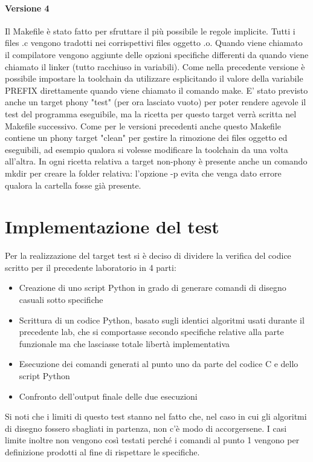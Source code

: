 \documentclass{article}
\begin{document}
		\paragraph*{Versione 4}
			Il Makefile è stato fatto per sfruttare il più possibile le regole implicite. Tutti i files .c vengono tradotti
			nei corrispettivi files oggetto .o.
			Quando viene chiamato il compilatore vengono aggiunte delle opzioni specifiche differenti da quando viene chiamato
			il linker (tutto racchiuso in variabili).
			Come nella precedente versione è possibile impostare la toolchain da utilizzare esplicitando il valore della
			variabile PREFIX direttamente quando viene chiamato il comando make.
			E' stato previsto anche un target phony "test" (per ora lasciato vuoto) per poter rendere agevole il test
			del programma eseguibile, ma la ricetta per questo target verrà scritta nel Makefile successivo.
			Come per le versioni precedenti anche questo Makefile contiene un phony target "clean" per gestire la rimozione
			dei files oggetto ed eseguibili, ad esempio qualora si volesse modificare la toolchain da una volta
			all'altra.
			In ogni ricetta relativa a target non-phony è presente anche un comando mkdir per creare la folder relativa:
			l'opzione -p evita che venga dato errore qualora la cartella fosse già presente.
\section{Implementazione del test}
	Per la realizzazione del target test si è deciso di dividere la verifica del codice scritto per il precedente laboratorio 
	in 4 parti:
	\begin{itemize}
		\item Creazione di uno script Python in grado di generare comandi di disegno casuali sotto specifiche
		\item Scrittura di un codice Python, basato sugli identici algoritmi usati durante il precedente lab, che si comportasse secondo specifiche relative alla parte funzionale ma che lasciasse totale libertà implementativa
		\item Esecuzione dei comandi generati al punto uno da parte del codice C e dello script Python
		\item Confronto dell'output finale delle due esecuzioni
	\end{itemize}
	Si noti che i limiti di questo test stanno nel fatto che, nel caso in cui gli algoritmi di disegno fossero sbagliati in 
	partenza, non c'è modo di accorgersene. I casi limite inoltre non vengono così testati perché i comandi al punto 1 vengono 
	per definizione prodotti al fine di rispettare le specifiche.
\end{document}
